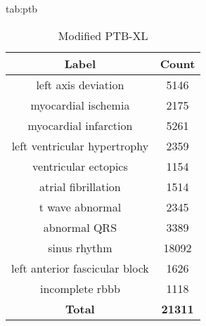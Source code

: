 \documentclass[pmlr,twocolumn]{jmlr}%
\begin{document}
\begin{table}[tbp]
\floatconts
  {tab:ptb}%
  {\caption{Modified PTB-XL}}%
  {
    \begin{tabular}{|c|c|}
     \hline
    Label & Count \\
     \hline
        left axis deviation                  &   5146 \\
        myocardial ischemia                  &   2175 \\
        myocardial infarction                &   5261 \\
        left ventricular hypertrophy         &   2359 \\
        ventricular ectopics                 &   1154 \\
        atrial fibrillation                  &   1514 \\
        t wave abnormal                      &   2345 \\
        abnormal QRS                         &   3389 \\
        sinus rhythm                         &  18092 \\
        left anterior fascicular block       &   1626 \\
        incomplete rbbb &   1118 \\
     \hline
    \textbf{Total} & \textbf{21311}\\
    \hline
    \end{tabular}
  }
\end{table}





\end{document}
